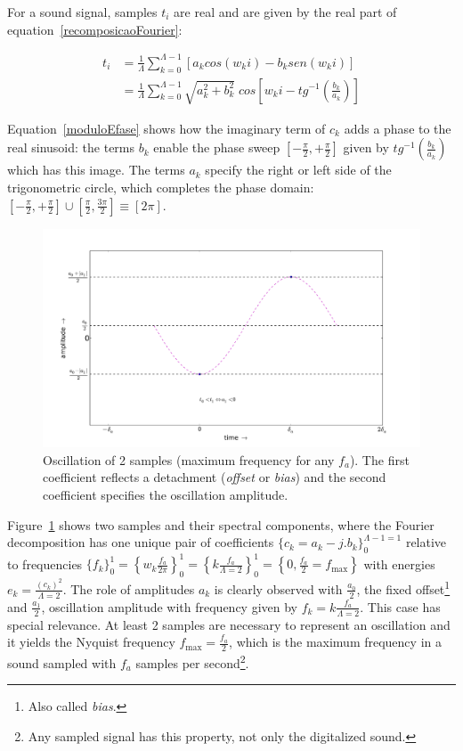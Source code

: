 For a sound signal, samples $t_i$ are real and are given by the real part of equation~\ref{recomposicaoFourier}:

\begin{equation}\label{moduloEfase}
\begin{split}
t_i& = \frac{1}{\Lambda}\sum_{k=0}^{\Lambda-1}\left[a_k cos(w_k i) -b_k sen(w_k i)\right] \\
   & = \frac{1}{\Lambda}\sum_{k=0}^{\Lambda-1}\sqrt{a_k^2 + b_k^2} \; cos\left[w_k i - tg^{-1}\left(\frac{b_k}{a_k}\right)\right]
\end{split}
\end{equation}

Equation~\ref{moduloEfase} shows how the imaginary term of $c_k$ adds a phase to the real sinusoid: the terms $b_k$ enable the phase sweep $\left[-\frac{\pi}{2},+\frac{\pi}{2}\right]$ given by $tg^{-1}\left(\frac{b_k}{a_k}\right)$ which has this image. The terms $a_k$ specify the right or left side of the trigonometric circle, which completes the phase domain: $\left[-\frac{\pi}{2},+\frac{\pi}{2}\right] \cup \left[\frac{\pi}{2},\frac{3\pi}{2}\right]\equiv [2\pi]$.



 \begin{figure}
     \centering
         \includegraphics[width=.7\textwidth]{figures/amostras2c__}
     \caption{Oscillation of 2 samples (maximum frequency for any $f_a$). The first coefficient reflects a detachment (\emph{offset} or \emph{bias}) and the second coefficient specifies the oscillation amplitude.}
         \label{fig:amostras2}
 \end{figure}

Figure~\ref{fig:amostras2} shows two samples and their spectral components, where the Fourier decomposition has one unique pair of coefficients $\{c_k=a_k-j.b_k\}_0^{\Lambda-1=1}$ relative to frequencies $\{f_k\}_0^1=\left\{w_k\frac{f_a}{2\pi}\right\}_0^1=\left\{k\frac{f_a}{\Lambda=2}\right\}_0^1=\left\{0,\frac{f_a}{2}=f_{\text{max}}\right\}$
with energies $e_k=\frac{(c_k)^2}{\Lambda=2}$. The role of amplitudes $a_k$ is clearly observed with $\frac{a_0}{2}$, the fixed offset\footnote{Also called \emph{bias}.} and $\frac{a_1}{2}$, oscillation amplitude with frequency given by $f_k=k \frac{f_a}{\Lambda=2}$.
This case has special relevance. At least 2 samples are necessary to represent an oscillation and it yields the Nyquist frequency $f_{\text{max}}=\frac{f_a}{2}$, which is the maximum frequency in a sound sampled with $f_a$ samples per second\footnote{Any sampled signal has this property, not only the digitalized sound.}.

